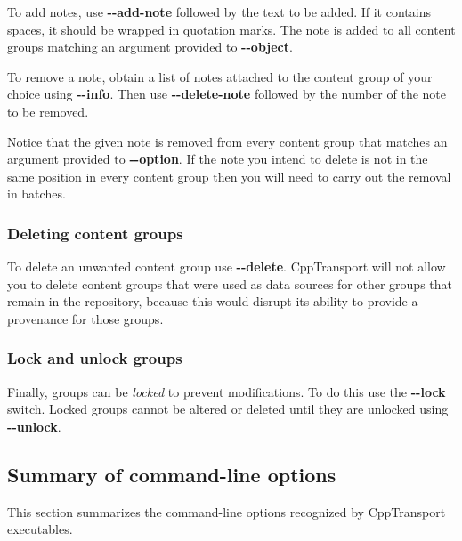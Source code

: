 \documentclass[11pt,a4paper]{article}
\newenvironment{warning}{\begin{tcolorbox}[enhanced,breakable,colback=red!10,colbacktitle=red!20,colframe=red!40,coltitle=black,title={Warning},fonttitle=\sffamily\fontseries{b}\selectfont]}{\end{tcolorbox}}
\newcommand{\packagefont}{\sffamily}
\newcommand{\CppTransport}{{\packagefont CppTransport}}
\newcommand{\option}[1]{{\ttfamily\bfseries\small #1}}
\begin{document}
To add notes, use
\option{{-}{-}add-note}
followed by the text to be added.
If it contains spaces, it should be wrapped in quotation marks.
The note is added to all content groups matching an argument provided
to \option{{-}{-}object}.

To remove a note, obtain a list of notes attached to the content group of your
choice using \option{{-}{-}info}.
Then use \option{{-}{-}delete-note} followed by the number of the note to be
removed.

\begin{warning}
    Notice that the given note is removed from every content group that matches
    an argument provided to \option{{-}{-}option}. If the note you intend to delete
    is not in the same position in every content group then you will need to carry out
    the removal in batches.    
\end{warning}

\subsubsection{Deleting content groups}
\label{sec:delete-content}

To delete an unwanted content group use \option{{-}{-}delete}.
{\CppTransport} will not allow you to delete content groups that were used
as data sources for other groups that remain in the repository,
because this would disrupt its ability to provide a provenance for those groups.

\subsubsection{Lock and unlock groups}
\label{sec:lock-unlock}

Finally, groups can be \emph{locked} to prevent modifications. To do this use the
\option{{-}{-}lock} switch.
Locked groups cannot be altered or deleted until they are unlocked using
\option{{-}{-}unlock}.

\subsection{Summary of command-line options}
\label{sec:option-summary}
This section summarizes the command-line
options recognized by {\CppTransport} executables.
\vspace{3mm}
\end{document}
